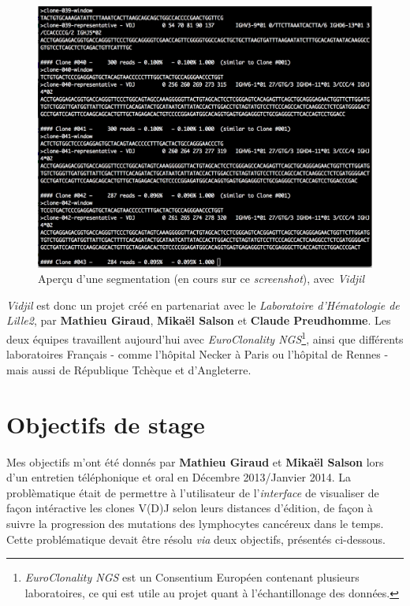 \documentclass[pdftex,12pt,a4paper]{report}
\begin{document}
\begin{spacing}{1.2}
\begin{figure}[H]
\begin{center}
	\includegraphics[scale=0.6]{img/C++-Ex.jpg}
\end{center}
\caption{Aperçu d'une segmentation (en cours sur ce \textit{screenshot}), avec \textit{Vidjil}}
\end{figure}

\textit{Vidjil} est donc un projet créé en partenariat avec le \textit{Laboratoire d'Hématologie de Lille2}, par \textbf{Mathieu Giraud}, \textbf{Mikaël Salson} et \textbf{Claude Preudhomme}.
Les deux équipes travaillent aujourd'hui avec \textit{EuroClonality NGS}\footnote{\textit{EuroClonality NGS} est un Consentium Européen contenant plusieurs laboratoires, ce qui est utile au projet quant à l'échantillonage des données.}, ainsi que différents laboratoires Français - comme l'hôpital Necker à Paris ou l'hôpital de Rennes - mais aussi de République Tchèque et d'Angleterre.

\section{Objectifs de stage}
Mes objectifs m'ont été donnés par \textbf{Mathieu Giraud} et \textbf{Mikaël Salson} lors d'un entretien téléphonique et oral en Décembre 2013/Janvier 2014.
\newline
La problèmatique était de permettre à l'utilisateur de l'\textit{interface} de visualiser de façon intéractive les clones V(D)J selon leurs distances d'édition, de façon à suivre la progression des mutations des lymphocytes cancéreux dans le temps.
\newline
Cette problématique devait être résolu \textit{via} deux objectifs, présentés ci-dessous. 


\end{spacing}
\end{document}
